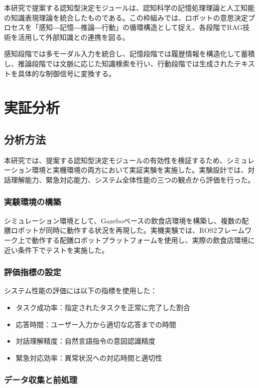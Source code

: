 \documentclass[12pt]{report}
\begin{document}
本研究で提案する認知型決定モジュールは、認知科学の記憶処理理論と人工知能の知識表現理論を統合したものである。この枠組みでは、ロボットの意思決定プロセスを「感知―記憶―推論―行動」の循環構造として捉え、各段階でRAG技術を活用して外部知識との連携を図る。

感知段階では多モーダル入力を統合し、記憶段階では履歴情報を構造化して蓄積し、推論段階では文脈に応じた知識検索を行い、行動段階では生成されたテキストを具体的な制御信号に変換する。

\chapter{実証分析}
\label{chap:analysis}

\section{分析方法}
\label{sec:methodology}

本研究では、提案する認知型決定モジュールの有効性を検証するため、シミュレーション環境と実機環境の両方において実証実験を実施した。実験設計では、対話理解能力、緊急対応能力、システム全体性能の三つの観点から評価を行った。

\subsection{実験環境の構築}

シミュレーション環境として、Gazeboベースの飲食店環境を構築し、複数の配膳ロボットが同時に動作する状況を再現した。実機実験では、ROS2フレームワーク上で動作する配膳ロボットプラットフォームを使用し、実際の飲食店環境に近い条件下でテストを実施した。

\subsection{評価指標の設定}

システム性能の評価には以下の指標を使用した：
\begin{itemize}
  \item タスク成功率：指定されたタスクを正常に完了した割合
  \item 応答時間：ユーザー入力から適切な応答までの時間
  \item 対話理解精度：自然言語指令の意図認識精度
  \item 緊急対応効率：異常状況への対応時間と適切性
\end{itemize}

\subsection{データ収集と前処理}
\end{document}
